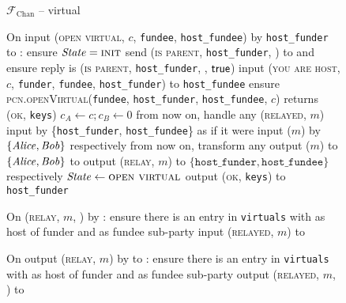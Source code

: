 \begin{figure}[H]
\begin{systembox}{$\mathcal{F}_{\mathrm{Chan}}$ -- virtual}
\begin{algorithmic}[1]
      \State On input (\textsc{open virtual}, $c$, \texttt{fundee},
      \texttt{host\_fundee}) by \texttt{host\_funder} to \alice:
      \label{code:functionality:chan:skeleton:virtual:open-virtual}
      \Indent
        \State ensure $\mathit{State} = \textsc{init}$
        \State send (\textsc{is parent}, \texttt{host\_funder}, \alice) to
        \gtrust and ensure reply is (\textsc{is parent}, \texttt{host\_funder},
        \alice, $\mathsf{true}$)  
        \State input (\textsc{you are host}, $c$, \texttt{funder},
        \texttt{fundee}, \texttt{host\_funder}) to \texttt{host\_fundee}
        \State {}
        \State {}
        \State {}
        \State ensure \textsc{pcn.openVirtual}(\texttt{fundee},
        \texttt{host\_funder}, \texttt{host\_fundee}, $c$) returns
        (\textsc{ok}, \texttt{keys})
        \label{code:functionality:chan:skeleton:virtual:ln}
        \State $c_A \gets c; c_B \gets 0$
        \State from now on, handle any (\textsc{relayed}, $m$) input by
        \{\texttt{host\_funder}, \texttt{host\_fundee}\} as if it were input
        ($m$) by $\{\mathit{Alice}, \mathit{Bob}\}$ respectively
        \State from now on, transform any output ($m$) to $\{\mathit{Alice}, \mathit{Bob}\}$ to
        output (\textsc{relay}, $m$) to $\{\texttt{host\_funder},
        \texttt{host\_fundee}\}$ respectively
        \State $\mathit{State} \gets \textsc{open virtual}$
        \State output (\textsc{ok}, \texttt{keys}) to \texttt{host\_funder}
      \EndIndent
      \Statex

      \State On (\textsc{relay}, $m$, \charlie) by \alice:
      \Indent
        \State ensure there is an entry in \texttt{virtuals} with \alice as host
        of funder and \charlie as fundee sub-party
        \label{code:functionality:chan:skeleton:virtual:relay:input:start}
        \State input (\textsc{relayed}, $m$) to \charlie
        \label{code:functionality:chan:skeleton:virtual:relay:input:end}
      \EndIndent
      \Statex

      \State On output (\textsc{relay}, $m$) by \charlie to \alice:
      \Indent
        \State ensure there is an entry in \texttt{virtuals} with \alice as host
        of funder and \charlie as fundee sub-party 
        \label{code:functionality:chan:skeleton:virtual:relay:output:start}
        \State output (\textsc{relayed}, $m$, \charlie) to \environment
        \label{code:functionality:chan:skeleton:virtual:relay:output:end}
      \EndIndent
    \end{algorithmic}
  \end{systembox}
  \caption{}
  \label{code:functionality:chan:skeleton:virtual}
\end{figure}
